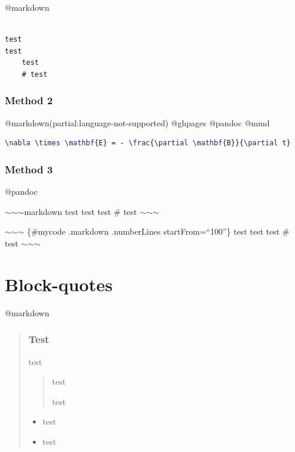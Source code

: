 @markdown

\begin{adjustwidth}{2.5em}{2.5em}
\begin{verbatim}

test
test
    test
    # test

\end{verbatim}
\end{adjustwidth}

\subsubsection{Method 2}
\label{method2}

@markdown(partial:language-not-supported) @ghpages @pandoc @mmd

\begin{adjustwidth}{2.5em}{2.5em}
\begin{lstlisting}[language=tex]
\nabla \times \mathbf{E} = - \frac{\partial \mathbf{B}}{\partial t}

\end{lstlisting}
\end{adjustwidth}

\subsubsection{Method 3}
\label{method3}

@pandoc

\ensuremath{\sim}\ensuremath{\sim}\ensuremath{\sim}markdown
test
test
 test
 \# test
\ensuremath{\sim}\ensuremath{\sim}\ensuremath{\sim}

\ensuremath{\sim}\ensuremath{\sim}\ensuremath{\sim} \{\#mycode .markdown .numberLines startFrom=``100''\}
test
test
 test
 \# test
\ensuremath{\sim}\ensuremath{\sim}\ensuremath{\sim}

\section{Block-quotes}
\label{block-quotes}

@markdown

\begin{quote}

\subsubsection{Test}
\label{test}

test

\begin{quote}

test

test
\end{quote}

\begin{itemize}
\item test

\item test

\end{itemize}
\end{quote}

